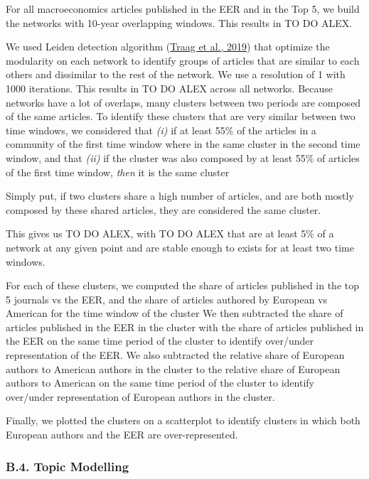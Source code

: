 \documentclass[]{elsarticle} %
\begin{document}
For all macroeconomics articles published in the EER and in the Top 5,
we build the networks with 10-year overlapping windows. This results in
TO DO ALEX.

We used Leiden detection algorithm
(\protect\hyperlink{ref-traag2019}{Traag et al., 2019}) that optimize
the modularity on each network to identify groups of articles that are
similar to each others and dissimilar to the rest of the network. We use
a resolution of 1 with 1000 iterations. This results in TO DO ALEX
across all networks. Because networks have a lot of overlaps, many
clusters between two periods are composed of the same articles. To
identify these clusters that are very similar between two time windows,
we considered that \emph{(i)} if at least 55\% of the articles in a
community of the first time window where in the same cluster in the
second time window, and that \emph{(ii)} if the cluster was also
composed by at least 55\% of articles of the first time window,
\emph{then} it is the same cluster

Simply put, if two clusters share a high number of articles, and are
both mostly composed by these shared articles, they are considered the
same cluster.

This gives us TO DO ALEX, with TO DO ALEX that are at least 5\% of a
network at any given point and are stable enough to exists for at least
two time windows.

For each of these clusters, we computed the share of articles published
in the top 5 journals vs the EER, and the share of articles authored by
European vs American for the time window of the cluster We then
subtracted the share of articles published in the EER in the cluster
with the share of articles published in the EER on the same time period
of the cluster to identify over/under representation of the EER. We also
subtracted the relative share of European authors to American authors in
the cluster to the relative share of European authors to American on the
same time period of the cluster to identify over/under representation of
European authors in the cluster.

Finally, we plotted the clusters on a scatterplot to identify clusters
in which both European authors and the EER are over-represented.

\hypertarget{topic}{%
\subsubsection*{B.4. Topic Modelling}\label{topic}}
\end{document}
